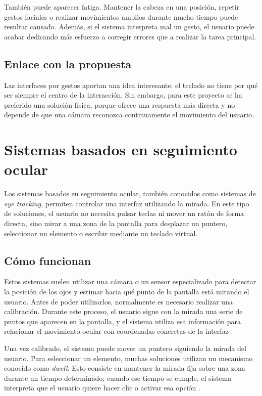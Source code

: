 También puede aparecer fatiga. Mantener la cabeza en una posición, repetir gestos faciales o realizar movimientos amplios durante mucho tiempo puede resultar cansado. Además, si el sistema interpreta mal un gesto, el usuario puede acabar dedicando más esfuerzo a corregir errores que a realizar la tarea principal.

\subsection{Enlace con la propuesta}

Las interfaces por gestos aportan una idea interesante: el teclado no tiene por qué ser siempre el centro de la interacción. Sin embargo, para este proyecto se ha preferido una solución física, porque ofrece una respuesta más directa y no depende de que una cámara reconozca continuamente el movimiento del usuario.



\section{Sistemas basados en seguimiento ocular}
\label{sec:eye-tracking}

Los sistemas basados en seguimiento ocular, también conocidos como sistemas de \textit{eye tracking}, permiten controlar una interfaz utilizando la mirada. En este tipo de soluciones, el usuario no necesita pulsar teclas ni mover un ratón de forma directa, sino mirar a una zona de la pantalla para desplazar un puntero, seleccionar un elemento o escribir mediante un teclado virtual.

\subsection{Cómo funcionan}

Estos sistemas suelen utilizar una cámara o un sensor especializado para detectar la posición de los ojos y estimar hacia qué punto de la pantalla está mirando el usuario. Antes de poder utilizarlos, normalmente es necesario realizar una calibración. Durante este proceso, el usuario sigue con la mirada una serie de puntos que aparecen en la pantalla, y el sistema utiliza esa información para relacionar el movimiento ocular con coordenadas concretas de la interfaz \cite{appleEyeTrackingIphone}.

Una vez calibrado, el sistema puede mover un puntero siguiendo la mirada del usuario. Para seleccionar un elemento, muchas soluciones utilizan un mecanismo conocido como \textit{dwell}. Esto consiste en mantener la mirada fija sobre una zona durante un tiempo determinado; cuando ese tiempo se cumple, el sistema interpreta que el usuario quiere hacer clic o activar esa opción \cite{appleEyeTrackingIphone}.

